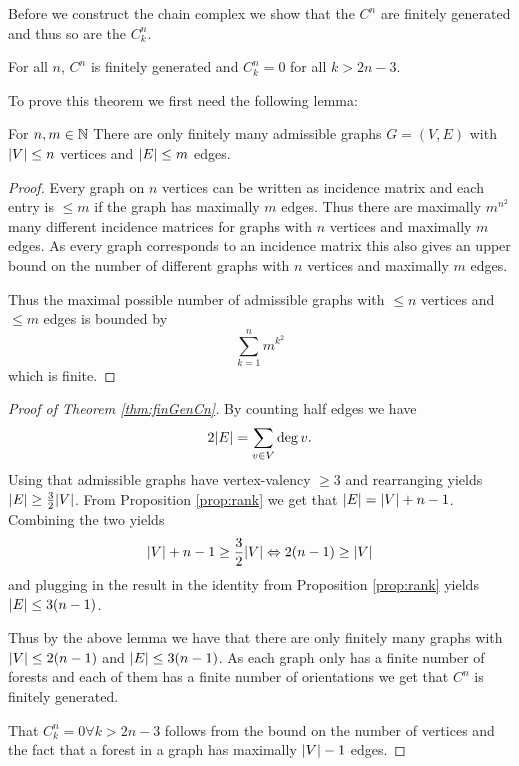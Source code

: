 Before we construct the chain complex we show that the $C^{n}$ are finitely generated and thus so are the $C_{k}^{n}$.

\begin{theorem}\label{thm:finGenCn}
	For all $n$, $C^{n}$ is finitely generated and $C_{k}^{n} = 0$ for all $k > 2n-3$. 
\end{theorem}

To prove this theorem we first need the following lemma:
\begin{lemma}
	For $n,m \in \mathbb{N}$ There are only finitely many admissible graphs $G = (V,E)$ with $\abs{V} \leq n$ vertices and $ \abs{E} \leq m$ edges.
\end{lemma}

\begin{proof}
	Every graph on $n$ vertices can be written as incidence matrix and each entry is $\leq m$ if the graph has maximally $m$ edges. 
	Thus there are maximally $m^{n^2}$ many different incidence matrices for graphs with  $n$ vertices and maximally $m$ edges.
	As every graph corresponds to an incidence matrix this also gives an upper bound on the number of different graphs with $n$ vertices
	and maximally $m$ edges.

	Thus the maximal possible number of admissible graphs with $\leq n$ vertices and $\leq m$ edges is bounded by
	\[
		\sum_{k=1}^{n} m^{k^2} 
	\]
	which is finite.
\end{proof}

\begin{proof}[Proof of Theorem \ref{thm:finGenCn}]
	By counting half edges we have
	\[
		2 \abs{E} = \sum_{v \in V} \deg{v}
	.\] 
	Using that admissible graphs have vertex-valency $\geq 3$ and rearranging yields $\abs{E} \geq \frac{3}{2} \abs{V}$.
	From Proposition \ref{prop:rank} we get that $\abs{E} = \abs{V} + n-1$.
	Combining the two yields
	\[
		\abs{V} + n -1 \geq \frac{3}{2} \abs{V} \Leftrightarrow 2 (n-1) \geq \abs{V}
	\] 
	and plugging in the result in the identity from Proposition \ref{prop:rank} yields $\abs{E} \leq 3 (n-1)$.

	Thus by the above lemma we have that there are only finitely many graphs with $\abs{V} \leq 2 (n-1)$ and $\abs{E} \leq 3(n-1)$.
	As each graph only has a finite number of forests and each of them has a finite number of orientations we get that
	$C^{n}$ is finitely generated.

	That $C_{k}^{n} = 0 \forall k > 2n -3$ follows from the bound on the number of vertices and the fact that a forest in a graph has maximally $\abs{V} - 1$ edges.
\end{proof}

